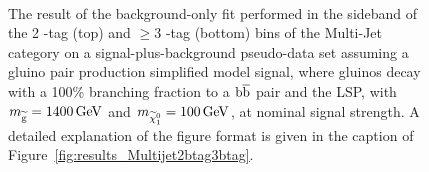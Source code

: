 \begin{figure}[!htb] \centering
{}\\
\caption{The result of the background-only fit performed in the
  sideband of the 2 \PQb-tag (top) and $\geq 3$ \PQb-tag (bottom) bins of the
  Multi-Jet category on a signal-plus-background pseudo-data set assuming a gluino pair production simplified
model signal, where gluinos decay with a 100\% branching fraction to a $\mathrm{b}\overline{\mathrm{b}}$ pair and the
 LSP, with $m_{\widetilde{\mathrm{g}}} = 1400 \,\text{Ge\hspace{-.08em}V}$ and  $m_{\widetilde{\chi}^{0}_1}=100 \,\text{Ge\hspace{-.08em}V}$, at
 nominal signal strength. A detailed explanation of the figure format is given in the caption of
  Figure~\ref{fig:results_Multijet2btag3btag}.}
\label{fig:signal_Multijet2btag3btag}
\end{figure}

